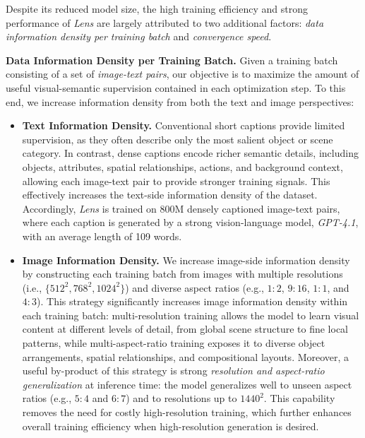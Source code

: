 Despite its reduced model size, the high training efficiency and strong performance of \textit{Lens} are largely attributed to two additional factors: \textit{data information density per training batch} and \textit{convergence speed}.

\noindent\textbf{Data Information Density per Training Batch.}
Given a training batch consisting of a set of \textit{image-text pairs}, our objective is to maximize the amount of useful visual-semantic supervision contained in each optimization step. To this end, we increase information density from both the text and image perspectives:

\begin{itemize}[leftmargin=*, labelsep=0.3em]
    \item \textbf{Text Information Density.} Conventional short captions provide limited supervision, as they often describe only the most salient object or scene category. In contrast, dense captions encode richer semantic details, including objects, attributes, spatial relationships, actions, and background context, allowing each image-text pair to provide stronger training signals. This effectively increases the text-side information density of the dataset. Accordingly, \textit{Lens} is trained on 800M densely captioned image-text pairs, where each caption is generated by a strong vision-language model, \textit{GPT-4.1}, with an average length of 109 words.
    \item \textbf{Image Information Density.} We increase image-side information density by constructing each training batch from images with multiple resolutions (i.e., $\{512^2, 768^2, 1024^2\}$) and diverse aspect ratios (e.g., $1{:}2$, $9{:}16$, $1{:}1$, and $4{:}3$). This strategy significantly increases image information density within each training batch: multi-resolution training allows the model to learn visual content at different levels of detail, from global scene structure to fine local patterns, while multi-aspect-ratio training exposes it to diverse object arrangements, spatial relationships, and compositional layouts. Moreover, a useful by-product of this strategy is strong \textit{resolution and aspect-ratio generalization} at inference time: the model generalizes well to unseen aspect ratios (e.g., $5{:}4$ and $6{:}7$) and to resolutions up to $1440^2$. This capability removes the need for costly high-resolution training, which further enhances overall training efficiency when high-resolution generation is desired. 
\end{itemize}

